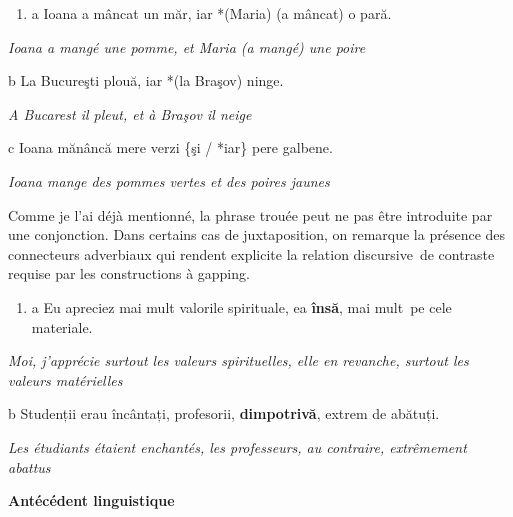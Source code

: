 \begin{enumerate}
\item \label{bkm:Ref289110958}a  Ioana a mâncat un măr, iar *(Maria) (a mâncat) o pară.


\end{enumerate}
{\itshape
Ioana a mangé une pomme, et Maria (a mangé) une poire  } 

  b  La Bucureşti plouă, iar *(la Braşov) ninge.

{\itshape
A Bucarest il pleut, et à Braşov il neige } 

  c  Ioana mănâncă mere verzi \{şi / *iar\} pere galbene.

\textit{Ioana mange des pommes vertes et des poires jaunes}  

Comme je l'ai déjà mentionné, la phrase trouée peut ne pas être introduite par une conjonction. Dans certains cas de juxtaposition, on remarque la présence des connecteurs adverbiaux qui rendent explicite la relation discursive~de contraste requise par les constructions à gapping.


\begin{enumerate}
\item \label{bkm:Ref299647036}a  Eu apreciez mai mult valorile spirituale, ea \textbf{însă}, mai mult~pe cele materiale.


\end{enumerate}
{\itshape
Moi, j'apprécie surtout les valeurs spirituelles, elle en revanche, surtout les valeurs matérielles  } 

  b  Studenții erau încântați, profesorii, \textbf{dimpotrivă}, extrem de abătuți.

{\itshape
Les étudiants étaient enchantés, les professeurs, au contraire, extrêmement abattus}

{\bfseries
Antécédent linguistique} 

